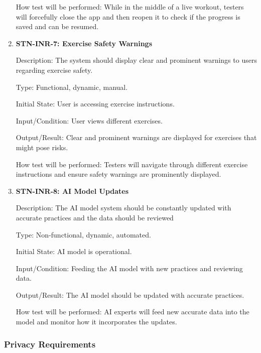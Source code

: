 \documentclass[12pt, titlepage]{article}
\begin{document}
\begin{enumerate}
        How test will be performed: While in the middle of a live workout, testers will forcefully close the app and then reopen it to check if the progress is saved and can be resumed.


        \item{\textbf{STN-INR-7: Exercise Safety Warnings}}

        Description: The system should display clear and prominent warnings to users regarding exercise safety.

        Type: Functional, dynamic, manual.

        Initial State: User is accessing exercise instructions.

        Input/Condition: User views different exercises.

        Output/Result: Clear and prominent warnings are displayed for exercises that might pose risks.

        How test will be performed: Testers will navigate through different exercise instructions and ensure safety warnings are prominently displayed.


        \item{\textbf{STN-INR-8: AI Model Updates}}

        Description: The AI model system should be constantly updated with accurate practices and the data should be reviewed

        Type: Non-functional, dynamic, automated.

        Initial State: AI model is operational.

        Input/Condition: Feeding the AI model with new practices and reviewing data.

        Output/Result: The AI model should be updated with accurate practices.

        How test will be performed: AI experts will feed new accurate data into the model and monitor how it incorporates the updates.

    \end{enumerate}


    \subsubsection{Privacy Requirements}
\end{document}
